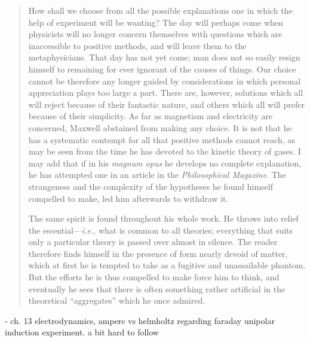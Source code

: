 \begin{quote}
    How shall we choose from all the possible explanations one in which the help of experiment will be wanting?  The day will perhaps come when physicists will no longer concern themselves with questions which are inaccessible to positive methods, and will leave them to the metaphysicians.  That day has not yet come; man does not so easily resign himself to remaining for ever ignorant of the causes of things.  Our choice cannot be therefore any longer guided by considerations in which personal appreciation plays too large a part.  There are, however, solutions which all will reject because of their fantastic nature, and others which all will prefer because of their simplicity.  As far as magnetism and electricity are concerned, Maxwell abstained from making any choice.  It is not that he has a systematic contempt for all that positive methods cannot reach, as may be seen from the time he has devoted to the kinetic theory of gases.  I may add that if in his \emph{magnum opus} he develops no complete explanation, he has attempted one in an article in the \emph{Philosophical Magazine}.  The strangeness and the complexity of the hypotheses he found himself compelled to make, led him afterwards to withdraw it.  
    
    The same spirit is found throughout his whole work.  He throws into relief the essential---\emph{i.e.}, what is common to all theories; everything that suits only a particular theory is passed over almost in silence.  The reader therefore finds himself in the presence of form nearly devoid of matter, which at first he is tempted to take as a fugitive and unassailable phantom.  But the efforts he is thus compelled to make force him to think, and eventually he sees that there is often something rather artificial in the theoretical ``aggregates'' which he once admired.
    
    \citep[p. 217-224]{Poincare1952}
\end{quote}

- ch. 13 electrodynamics, ampere vs helmholtz regarding faraday unipolar induction experiment.  a bit hard to follow

